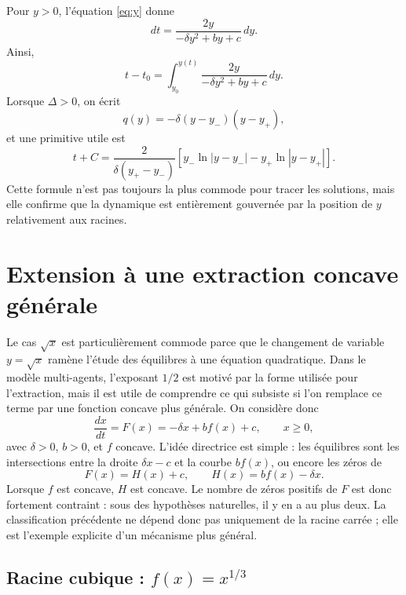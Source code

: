 \documentclass[11pt,a4paper]{article}
\begin{document}
Pour \(y>0\), l'équation \eqref{eq:y} donne
\[
    dt=\frac{2y}{-\delta y^2+by+c}\,dy.
\]
Ainsi,
\[
    t-t_0
    =
    \int_{y_0}^{y(t)}
    \frac{2y}{-\delta y^2+by+c}\,dy.
\]
Lorsque \(\Delta>0\), on écrit
\[
    q(y)=-\delta (y-y_-)(y-y_+),
\]
et une primitive utile est
\begin{equation}
    t+C
    =
    \frac{2}{\delta (y_+-y_-)}
    \left[
        y_- \ln|y-y_-|
        -
        y_+ \ln|y-y_+|
    \right].
    \label{eq:implicit}
\end{equation}
Cette formule n'est pas toujours la plus commode pour tracer les solutions, mais elle confirme que la dynamique est entièrement gouvernée par la position de \(y\) relativement aux racines.

\section{Extension à une extraction concave générale}

Le cas \(\sqrt{x}\) est particulièrement commode parce que le changement de variable \(y=\sqrt{x}\) ramène l'étude des équilibres à une équation quadratique. Dans le modèle multi-agents, l'exposant \(1/2\) est motivé par la forme utilisée pour l'extraction, mais il est utile de comprendre ce qui subsiste si l'on remplace ce terme par une fonction concave plus générale. On considère donc
\begin{equation}
    \frac{dx}{dt}=F(x)=-\delta x+b f(x)+c,
    \qquad x\geq 0,
    \label{eq:general_f}
\end{equation}
avec \(\delta>0\), \(b>0\), et \(f\) concave. L'idée directrice est simple : les équilibres sont les intersections entre la droite \(\delta x-c\) et la courbe \(b f(x)\), ou encore les zéros de
\[
    F(x)=H(x)+c,
    \qquad
    H(x)=b f(x)-\delta x.
\]
Lorsque \(f\) est concave, \(H\) est concave. Le nombre de zéros positifs de \(F\) est donc fortement contraint : sous des hypothèses naturelles, il y en a au plus deux. La classification précédente ne dépend donc pas uniquement de la racine carrée ; elle est l'exemple explicite d'un mécanisme plus général.

\subsection{Racine cubique : \(f(x)=x^{1/3}\)}
\end{document}
